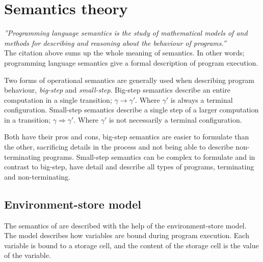 \section{Semantics theory}\label{sec:semantic}
\emph{''Programming language semantics is the study of mathematical models of and methods for describing and reasoning about the behaviour of programs.''}\cite{transtrees}\\
The citation above sums up the whole meaning of semantics. In other words; programming language semantics give a formal description of program execution.

Two forms of operational semantics are generally used when describing program behaviour, \emph{big-step} and \emph{small-step}.
Big-step semantics describe an entire computation in a single transition;
$ \gamma \rightarrow \gamma' $.
Where $\gamma'$ is always a terminal configuration.
Small-step semantics describe a single step of a larger computation in a transition; $ \gamma \Rightarrow \gamma' $. Where $ \gamma' $ is not necessarily a terminal configuration.

Both have their pros and cons, big-step semantics are easier to formulate than the other, sacrificing details in the process and not being able to describe non-terminating programs. Small-step semantics can be complex to formulate and in contrast to big-step, have detail and describe all types of programs, terminating and non-terminating.\cite{opsemantics}\cite{transtrees}

\subsection{Environment-store model}\label{subsec:env-sto}
The semantics of \langname{} are described with the help of the environment-store model. The model describes how variables are bound during program execution. Each variable is bound to a storage cell, and the content of the storage cell is the value of the variable.


